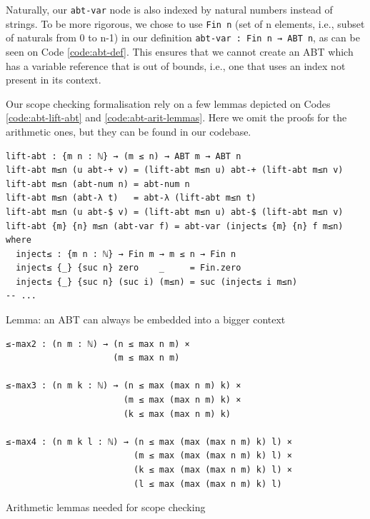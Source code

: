 Naturally, our \verb$abt-var$ node is also indexed by natural numbers instead of strings. To be more rigorous, we chose to use \verb$Fin n$ (set of n elements, i.e., subset of naturals from 0 to n-1) in our definition \verb$abt-var : Fin n → ABT n$, as can be seen on Code \ref{code:abt-def}. This ensures that we cannot create an ABT which has a variable reference that is out of bounds, i.e., one that uses an index not present in its context.

Our scope checking formalisation rely on a few lemmas depicted on Codes \ref{code:abt-lift-abt} and \ref{code:abt-arit-lemmas}. Here we omit the proofs for the arithmetic ones, but they can be found in our codebase.

\begin{listing}[H]
\begin{verbatim}
lift-abt : {m n : ℕ} → (m ≤ n) → ABT m → ABT n
lift-abt m≤n (u abt-+ v) = (lift-abt m≤n u) abt-+ (lift-abt m≤n v)
lift-abt m≤n (abt-num n) = abt-num n
lift-abt m≤n (abt-λ t)   = abt-λ (lift-abt m≤n t)
lift-abt m≤n (u abt-$ v) = (lift-abt m≤n u) abt-$ (lift-abt m≤n v)
lift-abt {m} {n} m≤n (abt-var f) = abt-var (inject≤ {m} {n} f m≤n) where
  inject≤ : {m n : ℕ} → Fin m → m ≤ n → Fin n
  inject≤ {_} {suc n} zero    _     = Fin.zero
  inject≤ {_} {suc n} (suc i) (m≤n) = suc (inject≤ i m≤n)
-- ...
\end{verbatim}
\caption{Lemma: an ABT can always be embedded into a bigger context}
\label{code:abt-lift-abt}
\end{listing}

\begin{listing}[H]
\begin{verbatim}
≤-max2 : (n m : ℕ) → (n ≤ max n m) ×
                     (m ≤ max n m)

≤-max3 : (n m k : ℕ) → (n ≤ max (max n m) k) ×
                       (m ≤ max (max n m) k) ×
                       (k ≤ max (max n m) k)

≤-max4 : (n m k l : ℕ) → (n ≤ max (max (max n m) k) l) ×
                         (m ≤ max (max (max n m) k) l) ×
                         (k ≤ max (max (max n m) k) l) ×
                         (l ≤ max (max (max n m) k) l)
\end{verbatim}
\caption{Arithmetic lemmas needed for scope checking}
\label{code:abt-arit-lemmas}
\end{listing}

